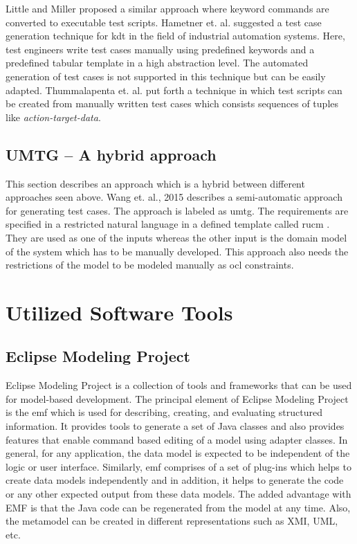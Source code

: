 Little and Miller \cite{little2006translating} proposed a similar approach where keyword commands are converted to executable test scripts. Hametner et. al. \cite{hametner2012agile} suggested a test case generation technique for \gls{kdt} in the field of industrial automation systems. Here, test engineers write test cases manually using predefined keywords and a predefined tabular template in a high abstraction level. The automated generation of test cases is not supported in this technique but can be easily adapted. Thummalapenta et. al. \cite{thummalapenta2012automating} put forth a technique in which test scripts can be created from manually written test cases which consists sequences of tuples like \textit{action-target-data}.


\subsection{UMTG – A hybrid approach}
This section describes an approach which is a hybrid between different approaches seen above. Wang et. al., 2015 \cite{wang2015automatic} describes a semi-automatic approach for generating test cases. The approach is labeled as \gls{umtg}. The requirements are specified in a restricted natural language in a defined template called \gls{rucm} \cite{yue2015rtcm}. They are used as one of the inputs whereas the other input is the domain model of the system which has to be manually developed. This approach also needs the restrictions of the model to be modeled manually as \gls{ocl} constraints. 

\section{Utilized Software Tools}

\subsection{Eclipse Modeling Project}
Eclipse Modeling Project \cite{eclipse} is a collection of tools and frameworks that can be used for model-based development. The principal element of Eclipse Modeling Project is the \gls{emf} which is used for describing, creating, and evaluating structured information. It provides tools to generate a set of Java classes and also provides features that enable command based editing of a model using adapter classes. In general, for any application, the data model is expected to be independent of the logic or user interface. Similarly, \gls{emf} comprises of a set of plug-ins which helps to create data models independently and in addition, it helps to generate the code or any other expected output from these data models. The added advantage with EMF is that the Java code can be regenerated from the model at any time. Also, the metamodel can be created in different representations such as XMI, UML, etc. 

